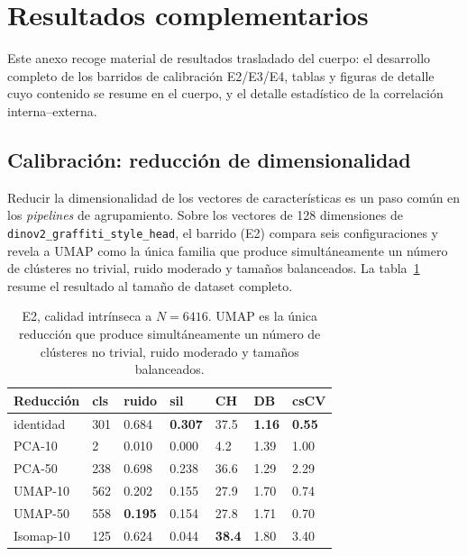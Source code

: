 
\section{Resultados complementarios}
\label{anexo:resultados}
Este anexo recoge material de resultados trasladado del cuerpo: el desarrollo
completo de los barridos de calibración E2/E3/E4, tablas y figuras de detalle
cuyo contenido se resume en el cuerpo, y el detalle estadístico de la
correlación interna--externa.

\subsection{Calibración: reducción de dimensionalidad}
\label{subsubsec:res-reduccion}
Reducir la dimensionalidad de los vectores de características es un paso común
en los \textit{pipelines} de agrupamiento. Sobre los vectores de 128
dimensiones de \texttt{dinov2\_graffiti\_style\_head}, el barrido (E2) compara
seis configuraciones y revela a UMAP como la única familia que produce
simultáneamente un número de clústeres no trivial, ruido moderado y tamaños
balanceados. La tabla~\ref{tab:e2-quality-6416} resume el resultado al tamaño
de dataset completo.

\begin{table}[b]
\caption[E2, calidad intrínseca a $N=6416$]{E2, calidad intrínseca a $N=6416$. UMAP es la única reducción que
produce simultáneamente un número de clústeres no trivial, ruido moderado y
tamaños balanceados. \glosacalidad}
\label{tab:e2-quality-6416}
\centering
{\footnotesize
\begin{tabular}{|p{2.0cm}|p{1.0cm}|p{1.0cm}|p{1.2cm}|p{1.0cm}|p{1.0cm}|p{1.0cm}|} \hline
  \textbf{Reducción} & \textbf{cls} & \textbf{ruido} & \textbf{sil} & \textbf{CH} & \textbf{DB} & \textbf{csCV} \\ \hline
  identidad   & 301 & 0.684 &  \textbf{0.307} & 37.5 & \textbf{1.16} & \textbf{0.55} \\ \hline
  PCA-10      & 2   & 0.010 &  0.000 &  4.2 & 1.39 & 1.00 \\ \hline
  PCA-50      & 238 & 0.698 &  0.238 & 36.6 & 1.29 & 2.29 \\ \hline
  UMAP-10     & 562 & 0.202 &  0.155 & 27.9 & 1.70 & 0.74 \\ \hline
  UMAP-50     & 558 & \textbf{0.195} &  0.154 & 27.8 & 1.71 & 0.70 \\ \hline
  Isomap-10   & 125 & 0.624 &  0.044 & \textbf{38.4} & 1.80 & 3.40 \\ \hline
\end{tabular}
}
\end{table}

